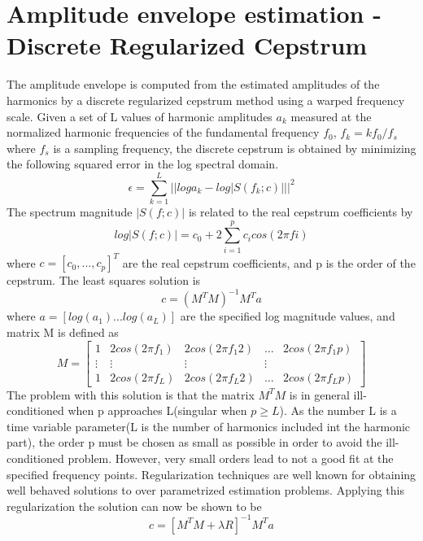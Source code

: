 \documentclass[BTech]{nitkdiss}
\begin{document}
\section{Amplitude envelope estimation - Discrete Regularized Cepstrum}
The amplitude envelope is computed from the estimated amplitudes of the harmonics by a discrete regularized cepstrum method using a warped frequency scale. Given a set of L values of harmonic amplitudes $a_{k}$ measured at the normalized harmonic frequencies of the fundamental frequency $f_{0}$, $f_{k} = kf_{0}/f_{s}$ where $f_{s}$ is a sampling frequency, the discrete cepstrum is obtained by minimizing the following squared error in the log spectral domain. $$\epsilon=\sum_{k=1}^{L}{\lvert \lvert log a_{k} - log\lvert S(f_{k};c)\rvert \rvert \rvert}^{2}$$ The spectrum magnitude $\lvert S(f;c)\rvert$ is related to the real cepstrum coefficients by $$log\lvert S(f;c)\rvert=c_{0}+2\sum_{i=1}^{p}c_{i}cos(2\pi fi)$$ where $c=[c_{0},...,c_{p}]^{T}$ are the real cepstrum coefficients, and p is the order of the cepstrum. The least squares solution is $$c=(M^{T}M)^{-1}M^{T}a$$ where $a=[log(a_{1})...log(a_{L})]$ are the specified log magnitude values, and matrix M is defined as $$M=\begin{bmatrix}1&2cos(2\pi f_{1})&2cos(2\pi f_{1}2)&\dots&2cos(2\pi f_{1}p)\\ \vdots&\vdots&\vdots&\vdots\\ 1&2cos(2\pi f_{L})&2cos(2\pi f_{L}2)&\dots&2cos(2\pi f_{L}p)\end{bmatrix}$$ The problem with this solution is that the matrix $M^{T}M$ is in general ill-conditioned when p approaches L(singular when $p\geqslant L$). As the number L is a time variable parameter(L is the number of harmonics included int the harmonic part), the order p must be chosen as small as possible in order to avoid the ill-conditioned problem. However, very small orders lead to not a good fit at the specified frequency points. Regularization techniques are well known for obtaining well behaved solutions to over parametrized estimation problems. Applying this regularization the solution can now be shown to be $$c=[M^{T}M+\lambda R]^{-1}M^{T}a$$
\end{document}
